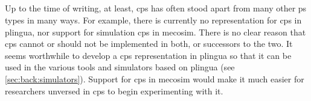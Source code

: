 \subsection{}
Up to the time of writing, at least, \gls{cps} has often stood apart from many other \gls{ps} types in many ways.  For example, there is currently no representation for \gls{cps} in \gls{plingua}, nor support for simulation \gls{cps} in \gls{mecosim}.  There is no clear reason that \gls{cps} cannot or should not be implemented in both, or successors to the two.  It seems worthwhile to develop a \gls{cps} representation in \gls{plingua} so that it can be used in the various tools and simulators based on \gls{plingua} (see \vref{sec:back:simulators}).  Support for \gls{cps} in \gls{mecosim} would make it much easier for researchers unversed in \gls{cps} to begin experimenting with it.

